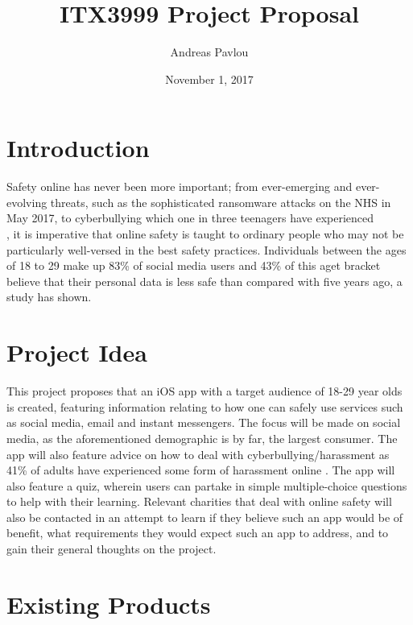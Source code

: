 \documentclass{article}
\author{Andreas Pavlou}
\title{ITX3999 Project Proposal}
\date{November 1, 2017}
\begin{document}
\maketitle
\newpage



\section{Introduction}

Safety online has never been more important; from ever-emerging and ever-evolving threats, such as the sophisticated ransomware attacks on the NHS in May 2017, to cyberbullying which one in three teenagers have experienced \\
\cite{association_number_2014}, it is imperative that online safety is taught to ordinary people who may not be particularly well-versed in the best safety practices. Individuals between the ages of 18 to 29 make up 83\% of social media users and 43\% of this aget bracket believe that their personal data is less safe than compared with five years ago, a study  \cite{pew_research_2012} has shown. 



\section{Project Idea}

This project proposes that an iOS app with a target audience of 18-29 year olds is created, featuring information relating to how one can safely use services such as social media, email and instant messengers. The focus will be made on social media, as the aforementioned demographic is by far, the largest consumer. The app will also feature advice on how to deal with cyberbullying/harassment as 41\% of adults have experienced some form of harassment online \cite{duggan_online_2017}. The app will also feature a quiz, wherein users can partake in simple multiple-choice questions to help with their learning. Relevant charities that deal with online safety will also be contacted in an attempt to learn if they believe such an app would be of benefit, what requirements they would expect such an app to address, and to gain their general thoughts on the project.

\section{Existing Products} 
\end{document}
